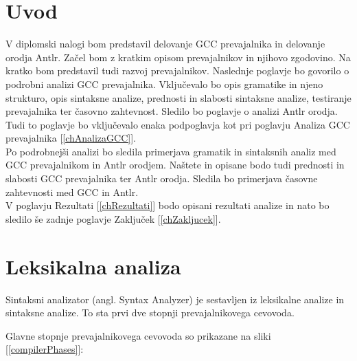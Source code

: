 \documentclass[a4paper, 12pt, tikz, border=5]{book}
\begin{document}
\chapter{Uvod}
V diplomski nalogi bom predstavil delovanje GCC prevajalnika in delovanje orodja Antlr. Začel bom z kratkim opisom prevajalnikov in njihovo zgodovino. Na kratko bom predstavil tudi razvoj prevajalnikov. Naslednje poglavje bo govorilo o podrobni analizi GCC prevajalnika. Vključevalo bo opis gramatike in njeno strukturo, opis sintaksne analize, prednosti in slabosti sintaksne analize, testiranje prevajalnika ter časovno zahtevnost. Sledilo bo poglavje o analizi Antlr orodja. Tudi to poglavje bo vključevalo enaka podpoglavja kot pri poglavju Analiza GCC prevajalnika [\ref{chAnalizaGCC}].
\\
Po podrobnejši analizi bo sledila primerjava gramatik in sintaksnih analiz med GCC prevajalnikom in Antlr orodjem. Naštete in opisane bodo tudi prednosti in slabosti GCC prevajalnika ter Antlr orodja. Sledila bo primerjava časovne zahtevnosti med GCC in Antlr. 
\\
V poglavju Rezultati [\ref{chRezultati}] bodo opisani rezultati analize in nato bo sledilo še zadnje poglavje Zaključek [\ref{chZakljucek}].


\chapter{Leksikalna analiza}
\label{chLexicalAnalysis}
Sintaksni analizator (angl. Syntax Analyzer) je sestavljen iz leksikalne analize in sintaksne analize. To sta prvi dve stopnji prevajalnikovega cevovoda. 

Glavne stopnje prevajalnikovega cevovoda so prikazane na sliki [\ref{compilerPhases}]:
\end{document}
